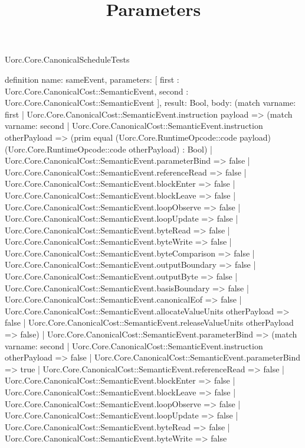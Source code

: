 \begin{lexlean}{Uorc.Core.CanonicalScheduleTests}
\title{Parameters}
\begin{semanticmodule}
definition{
  name: sameEvent,
  parameters: [
    first : Uorc.Core.CanonicalCost::SemanticEvent,
    second : Uorc.Core.CanonicalCost::SemanticEvent
  ],
  result: Bool,
  body: (match var{name: first}
    | Uorc.Core.CanonicalCost::SemanticEvent.instruction payload => (match var{name: second}
      | Uorc.Core.CanonicalCost::SemanticEvent.instruction otherPayload => (prim equal (Uorc.Core.RuntimeOpcode::code payload) (Uorc.Core.RuntimeOpcode::code otherPayload) : Bool)
      | Uorc.Core.CanonicalCost::SemanticEvent.parameterBind => false
      | Uorc.Core.CanonicalCost::SemanticEvent.referenceRead => false
      | Uorc.Core.CanonicalCost::SemanticEvent.blockEnter => false
      | Uorc.Core.CanonicalCost::SemanticEvent.blockLeave => false
      | Uorc.Core.CanonicalCost::SemanticEvent.loopObserve => false
      | Uorc.Core.CanonicalCost::SemanticEvent.loopUpdate => false
      | Uorc.Core.CanonicalCost::SemanticEvent.byteRead => false
      | Uorc.Core.CanonicalCost::SemanticEvent.byteWrite => false
      | Uorc.Core.CanonicalCost::SemanticEvent.byteComparison => false
      | Uorc.Core.CanonicalCost::SemanticEvent.outputBoundary => false
      | Uorc.Core.CanonicalCost::SemanticEvent.outputByte => false
      | Uorc.Core.CanonicalCost::SemanticEvent.basisBoundary => false
      | Uorc.Core.CanonicalCost::SemanticEvent.canonicalEof => false
      | Uorc.Core.CanonicalCost::SemanticEvent.allocateValueUnits otherPayload => false
      | Uorc.Core.CanonicalCost::SemanticEvent.releaseValueUnits otherPayload => false)
    | Uorc.Core.CanonicalCost::SemanticEvent.parameterBind => (match var{name: second}
      | Uorc.Core.CanonicalCost::SemanticEvent.instruction otherPayload => false
      | Uorc.Core.CanonicalCost::SemanticEvent.parameterBind => true
      | Uorc.Core.CanonicalCost::SemanticEvent.referenceRead => false
      | Uorc.Core.CanonicalCost::SemanticEvent.blockEnter => false
      | Uorc.Core.CanonicalCost::SemanticEvent.blockLeave => false
      | Uorc.Core.CanonicalCost::SemanticEvent.loopObserve => false
      | Uorc.Core.CanonicalCost::SemanticEvent.loopUpdate => false
      | Uorc.Core.CanonicalCost::SemanticEvent.byteRead => false
      | Uorc.Core.CanonicalCost::SemanticEvent.byteWrite => false
}
\end{semanticmodule}
\end{lexlean}
